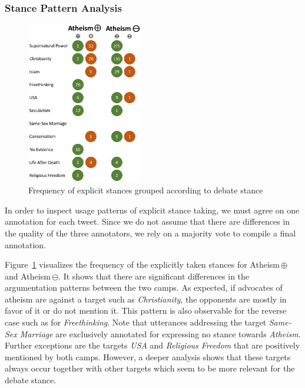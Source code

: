 \documentclass[11pt]{article}
\begin{document}
\subsubsection{Stance Pattern Analysis}

\begin{figure}[ht!]
\centering
  \includegraphics[width=0.45\textwidth]{figures/patterns_flat.png}
  \caption{Frequency of explicit stances grouped according to debate stance}
  \label{fig:patterns_flat}
\end{figure}

In order to inspect usage patterns of explicit stance taking, we must agree on one annotation for each tweet.
Since we do not assume that there are differences in the quality of the three annotators, we rely on a majority vote to compile a final annotation. 

Figure~\ref{fig:patterns_flat} visualizes the frequency of the explicitly taken stances for Atheism\,$\oplus$ and Atheism\,$\ominus$.
It shows that there are significant differences in the argumentation patterns between the two camps.
As expected, if advocates of atheism are against a target such as \textit{Christianity}, the opponents are mostly in favor of it or do not mention it.
This pattern is also observable for the reverse case such as for \textit{Freethinking}.
Note that utterances addressing the target \textit{Same-Sex Marriage} are exclusively annotated for expressing no stance towards \textit{Atheism}.
Further exceptions are the targets \textit{USA} and \textit{Religious Freedom} that are positively mentioned by both camps.
However, a deeper analysis shows that these targets always occur together with other targets which seem to be more relevant for the debate stance.
\end{document}
